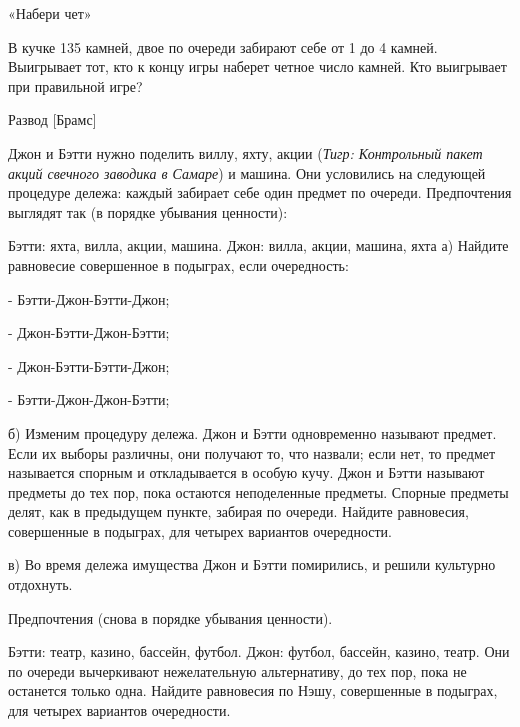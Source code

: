 


\begin{problem}
 «Набери чет»\par
В кучке 135 камней, двое по очереди забирают себе от 1 до 4 камней. Выигрывает тот, кто к концу игры наберет четное число камней. Кто выигрывает при правильной игре?\par



\begin{sol}

\end{sol}
\end{problem}



\begin{problem}
 Развод [Брамс]\par
Джон и Бэтти нужно поделить виллу, яхту, акции ({\it Тигр: Контрольный пакет акций свечного заводика в Самаре}) и машина. Они условились на следующей процедуре дележа: каждый забирает себе один предмет по очереди.
Предпочтения выглядят так (в порядке убывания ценности):\par
Бэтти: яхта, вилла, акции, машина. Джон: вилла, акции, машина, яхта
а)      Найдите равновесие совершенное в подыграх, если очередность:\par
- Бэтти-Джон-Бэтти-Джон;\par
- Джон-Бэтти-Джон-Бэтти;\par
- Джон-Бэтти-Бэтти-Джон;\par
- Бэтти-Джон-Джон-Бэтти;\par
б) Изменим процедуру дележа. Джон и Бэтти одновременно называют предмет. Если их выборы различны, они получают то, что назвали; если нет, то предмет называется спорным и откладывается в особую кучу. Джон и Бэтти называют предметы до тех пор, пока остаются неподеленные предметы. Спорные предметы делят, как в предыдущем пункте, забирая по очереди. Найдите равновесия, совершенные в подыграх, для четырех вариантов очередности.\par
в) Во время дележа имущества Джон и Бэтти помирились, и решили культурно отдохнуть.\par
Предпочтения (снова в порядке убывания ценности).\par
Бэтти: театр, казино, бассейн, футбол. Джон: футбол, бассейн, казино, театр.
Они по очереди вычеркивают нежелательную альтернативу, до тех пор, пока не останется только одна. Найдите равновесия по Нэшу, совершенные в подыграх, для четырех вариантов очередности.\par



\begin{sol}

\end{sol}
\end{problem}



